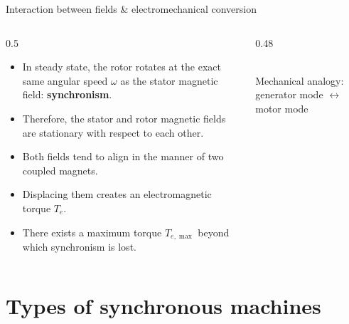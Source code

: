 \begin{frame}{Interaction between fields \& electromechanical conversion}
  \begin{columns}
    \begin{column}{0.5\textwidth}
      \begin{itemize}\setlength{\itemsep}{2pt}\small
        \item In steady state, the rotor rotates at the exact same angular speed $\omega$ as the stator magnetic field: \textbf{synchronism}.
        \item Therefore, the stator and rotor magnetic fields are stationary with respect to each other.
        \item Both fields tend to align in the manner of two coupled magnets.
        \item Displacing them creates an electromagnetic torque $T_e$.
        \item There exists a maximum torque $T_{e,\max}$ beyond which synchronism is lost.
      \end{itemize}
    \end{column}
    \begin{column}{0.48\textwidth}
      \begin{center}
        \resizebox{\linewidth}{!}{}\\
        \vspace{0.1cm}
        \small Mechanical analogy: generator mode $\leftrightarrow$ motor mode
      \end{center}
    \end{column}
  \end{columns}
\end{frame}

\section{Types of synchronous machines}

